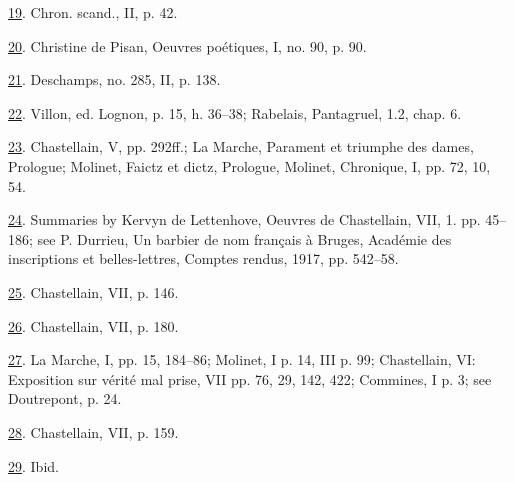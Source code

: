 \protect\hypertarget{23_NOTES.xhtmlux5cux23id_87}{\protect\hyperlink{22_Chapter_Fourteen__THE_COMING_OF.xhtmlux5cux23id_86}{19}}.
Chron. scand., II, p. 42.

\protect\hypertarget{23_NOTES.xhtmlux5cux23id_85}{\protect\hyperlink{22_Chapter_Fourteen__THE_COMING_OF.xhtmlux5cux23id_84}{20}}.
Christine de Pisan, Oeuvres poétiques, I, no. 90, p. 90.

\protect\hypertarget{23_NOTES.xhtmlux5cux23id_83}{\protect\hyperlink{22_Chapter_Fourteen__THE_COMING_OF.xhtmlux5cux23id_82}{21}}.
Deschamps, no. 285, II, p. 138.

\protect\hypertarget{23_NOTES.xhtmlux5cux23id_81}{\protect\hyperlink{22_Chapter_Fourteen__THE_COMING_OF.xhtmlux5cux23id_80}{22}}.
Villon, ed. Lognon, p. 15, h. 36--38; Rabelais, Pantagruel, 1.2, chap.
6.

\protect\hypertarget{23_NOTES.xhtmlux5cux23id_79}{\protect\hyperlink{22_Chapter_Fourteen__THE_COMING_OF.xhtmlux5cux23id_78}{23}}.
Chastellain, V, pp. 292ff.; La Marche, Parament et triumphe des dames,
Prologue; Molinet, Faictz et dictz, Prologue, Molinet, Chronique, I, pp.
72, 10, 54.

\protect\hypertarget{23_NOTES.xhtmlux5cux23id_77}{\protect\hyperlink{22_Chapter_Fourteen__THE_COMING_OF.xhtmlux5cux23id_76}{24}}.
Summaries by Kervyn de Lettenhove, Oeuvres de Chastellain, VII, 1. pp.
45--186; see P. Durrieu, Un barbier de nom français à Bruges, Académie
des inscriptions et belles-lettres, Comptes rendus, 1917, pp. 542--58.

\protect\hypertarget{23_NOTES.xhtmlux5cux23id_75}{\protect\hyperlink{22_Chapter_Fourteen__THE_COMING_OF.xhtmlux5cux23id_74}{25}}.
Chastellain, VII, p. 146.

\protect\hypertarget{23_NOTES.xhtmlux5cux23id_73}{\protect\hyperlink{22_Chapter_Fourteen__THE_COMING_OF.xhtmlux5cux23id_72}{26}}.
Chastellain, VII, p. 180.

\protect\hypertarget{23_NOTES.xhtmlux5cux23id_71}{\protect\hyperlink{22_Chapter_Fourteen__THE_COMING_OF.xhtmlux5cux23id_70}{27}}.
La Marche, I, pp. 15, 184--86; Molinet, I p. 14, III p. 99; Chastellain,
VI: Exposition sur vérité mal prise, VII pp. 76, 29, 142, 422; Commines,
I p. 3; see Doutrepont, p. 24.

\protect\hypertarget{23_NOTES.xhtmlux5cux23id_69}{\protect\hyperlink{22_Chapter_Fourteen__THE_COMING_OF.xhtmlux5cux23id_68}{28}}.
Chastellain, VII, p. 159.

\protect\hypertarget{23_NOTES.xhtmlux5cux23id_67}{\protect\hyperlink{22_Chapter_Fourteen__THE_COMING_OF.xhtmlux5cux23id_66}{29}}.
Ibid.

